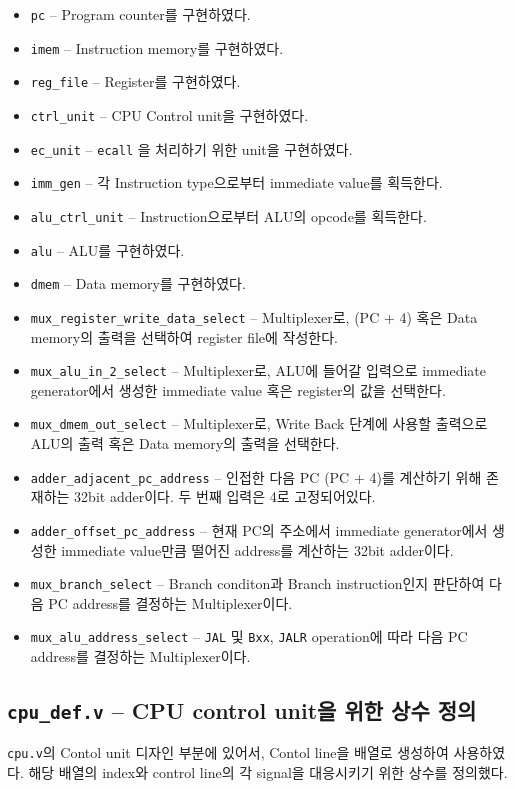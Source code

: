 \documentclass{scrartcl}
\begin{document}
\begin{itemize}
    \item \texttt{pc} -- Program counter를 구현하였다.
    \item \texttt{imem} -- Instruction memory를 구현하였다.
    \item \texttt{reg\_file} -- Register를 구현하였다.
    \item \texttt{ctrl\_unit} -- CPU Control unit을 구현하였다.
    \item \texttt{ec\_unit} -- \texttt{ecall} 을 처리하기 위한 unit을 구현하였다.
    \item \texttt{imm\_gen} -- 각 Instruction type으로부터 immediate value를 획득한다.
    \item \texttt{alu\_ctrl\_unit} -- Instruction으로부터 ALU의 opcode를 획득한다.
    \item \texttt{alu} -- ALU를 구현하였다.
    \item \texttt{dmem} -- Data memory를 구현하였다.
    \item \texttt{mux\_register\_write\_data\_select} -- Multiplexer로, (PC + 4) 혹은 Data memory의 출력을 선택하여 register file에 작성한다.
    \item \texttt{mux\_alu\_in\_2\_select} -- Multiplexer로, ALU에 들어갈 입력으로 immediate generator에서 생성한 immediate value 혹은 register의 값을 선택한다.
    \item \texttt{mux\_dmem\_out\_select} -- Multiplexer로, Write Back 단계에 사용할 출력으로 ALU의 출력 혹은 Data memory의 출력을 선택한다.
    \item \texttt{adder\_adjacent\_pc\_address} -- 인접한 다음 PC (PC + 4)를 계산하기 위해 존재하는 32bit adder이다. 두 번째 입력은 4로 고정되어있다.
    \item \texttt{adder\_offset\_pc\_address} -- 현재 PC의 주소에서 immediate generator에서 생성한 immediate value만큼 떨어진 address를 계산하는 32bit adder이다.
    \item \texttt{mux\_branch\_select} -- Branch conditon과 Branch instruction인지 판단하여 다음 PC address를 결정하는 Multiplexer이다.
    \item \texttt{mux\_alu\_address\_select} -- \texttt{JAL} 및 \texttt{Bxx}, \texttt{JALR} operation에 따라 다음 PC address를 결정하는 Multiplexer이다.
\end{itemize}


\subsection{\texttt{cpu\_def.v} -- CPU control unit을 위한 상수 정의}
\texttt{cpu.v}의 Contol unit 디자인 부분에 있어서, Contol line을 배열로 생성하여 사용하였다.
해당 배열의 index와 control line의 각 signal을 대응시키기 위한 상수를 정의했다.
\end{document}
